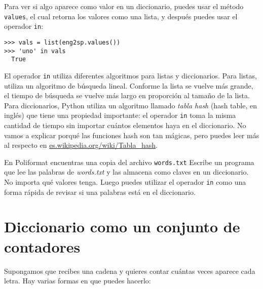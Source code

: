 Para ver si algo aparece como valor en un diccionario, puedes usar el
método \texttt{values}, el cual retorna los valores como una lista, y
después puedes usar el operador \texttt{in}:

 


\begin{Verbatim}[frame=single]
>>> vals = list(eng2sp.values())
>>> 'uno' in vals
  True
\end{Verbatim}


El operador \texttt{in} utiliza diferentes algoritmos para listas y
diccionarios. Para listas, utiliza un algoritmo de búsqueda lineal.
Conforme la lista se vuelve más grande, el tiempo de búsqueda se vuelve
más largo en proporción al tamaño de la lista. Para diccionarios, Python
utiliza un algoritmo llamado \emph{tabla hash} (hash table, en inglés)
que tiene una propiedad importante: el operador \texttt{in} toma la
misma cantidad de tiempo sin importar cuántos elementos haya en el
diccionario. No vamos a explicar porqué las funciones hash son tan
mágicas, pero puedes leer más al respecto en
\href{https://es.wikipedia.org/wiki/Tabla_hash}{es.wikipedia.org/wiki/Tabla\_hash}.

  


\begin{exercise}
En Poliformat encuentras una copia del archivo \texttt{words.txt}
Escribe un programa que lee las palabras de \emph{words.txt} y
las almacena como claves en un diccionario. No importa qué valores
tenga. Luego puedes utilizar el operador \texttt{in} como una forma
rápida de revisar si una palabras está en el diccionario.
\end{exercise}


\hypertarget{diccionario-como-un-conjunto-de-contadores}{%
\section{Diccionario como un conjunto de
contadores}\label{diccionario-como-un-conjunto-de-contadores}}


Supongamos que recibes una cadena y quieres contar cuántas veces aparece
cada letra. Hay varias formas en que puedes hacerlo:

